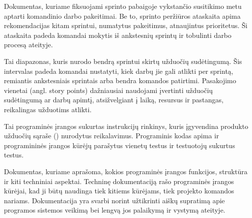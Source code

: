 
 {
Dokumentas, kuriame fiksuojami sprinto pabaigoje vykstančio susitikimo metu aptarti komandinio darbo pakeitimai. Be to, sprinto peržiūros ataskaita apima rekomendacijas kitam sprintui, numatytus pakeitimus, atnaujintus prioritetus. Ši ataskaita padeda komandai mokytis iš ankstesnių sprintų ir tobulinti darbo procesą ateityje.
}

 {
 Tai diapazonas, kuris nurodo bendrą sprintui skirtų užduočių sudėtingumą. Šis intervalas padeda komandai nustatyti, kiek darbų jie gali atlikti per sprintą, remiantis ankstesniais sprintais arba bendra komandos patirtimi. Pasakojimo vienetai (angl. story points) dažniausiai naudojami įvertinti užduočių sudėtingumą ar darbų apimtį, atsižvelgiant į laiką, resursus ir pastangas, reikalingas užduotims atlikti.
}

 {
Tai programinės įrangos sukurtas instrukcijų rinkinys, kuris įgyvendina produkto užduočių sąraše () nurodytus reikalavimus. Programinis kodas apima ir  programininės įrangos kūrėjų parašytus vienetų testus ir testuotojų sukurtus testus.
}

 {
Dokumentas, kuriame aprašoma, kokios programinės įrangos funkcijos, struktūra ir kiti techniniai aspektai. Techninę dokumentaciją rašo programinės įrangos kūrėjai, kad ji būtų naudinga tiek kitiems kūrėjams, tiek projekto komandos nariams. Dokumentacija yra svarbi norint užtikrinti aiškų supratimą apie programos sistemos veikimą bei lengvą jos palaikymą ir vystymą ateityje.
}

